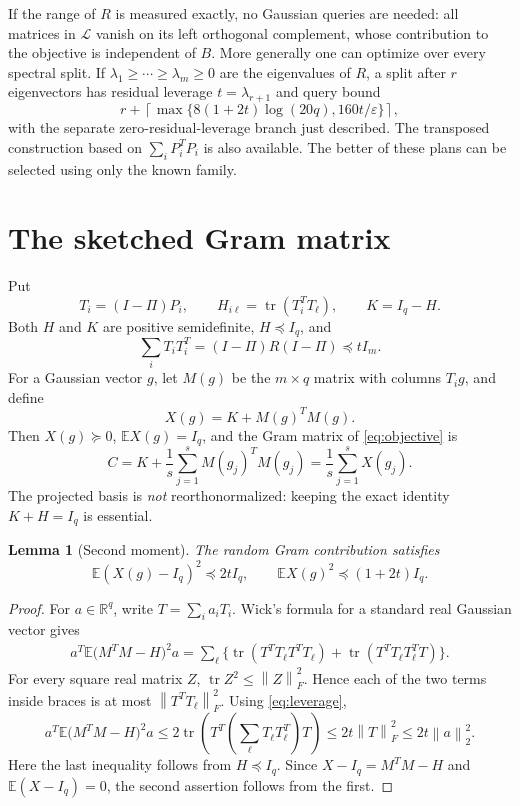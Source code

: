 \documentclass[11pt]{article}
\newtheorem{lemma}[theorem]{Lemma}
\theoremstyle{definition}
\newcommand{\R}{\mathbb R}
\newcommand{\E}{\mathbb E}
\newcommand{\tr}{\operatorname{tr}}
\newcommand{\norm}[1]{\left\lVert#1\right\rVert}
\newcommand{\eps}{\varepsilon}
\begin{document}
If the range of $R$ is measured exactly, no Gaussian queries are needed: all matrices in $\mathcal L$ vanish on its left orthogonal complement, whose contribution to the objective is independent of $B$. More generally one can optimize over every spectral split. If $\lambda_1\ge\cdots\ge\lambda_m\ge0$ are the eigenvalues of $R$, a split after $r$ eigenvectors has residual leverage $t=\lambda_{r+1}$ and query bound
\[
 r+\left\lceil\max\{8(1+2t)\log(20q),160t/\eps\}\right\rceil,
\]
with the separate zero-residual-leverage branch just described. The transposed construction based on $\sum_iP_i^TP_i$ is also available. The better of these plans can be selected using only the known family.

\section{The sketched Gram matrix}
Put
\[
 T_i=(I-\Pi)P_i,\qquad
 H_{i\ell}=\tr(T_i^TT_\ell),\qquad K=I_q-H.
\]
Both $H$ and $K$ are positive semidefinite, $H\preceq I_q$, and
\begin{equation}\label{eq:leverage}
 \sum_iT_iT_i^T=(I-\Pi)R(I-\Pi)\preceq tI_m.
\end{equation}
For a Gaussian vector $g$, let $M(g)$ be the $m\times q$ matrix with columns $T_i g$, and define
\[
 X(g)=K+M(g)^TM(g).
\]
Then $X(g)\succeq0$, $\E X(g)=I_q$, and the Gram matrix of \eqref{eq:objective} is
\[
 C=K+\frac1s\sum_{j=1}^sM(g_j)^TM(g_j)
   =\frac1s\sum_{j=1}^sX(g_j).
\]
The projected basis is \emph{not} reorthonormalized: keeping the exact identity $K+H=I_q$ is essential.

\begin{lemma}[Second moment]\label{lem:moment}
The random Gram contribution satisfies
\[
 \E(X(g)-I_q)^2\preceq2tI_q,
 \qquad \E X(g)^2\preceq(1+2t)I_q.
\]
\end{lemma}
\begin{proof}
For $a\in\R^q$, write $T=\sum_i a_iT_i$. Wick's formula for a standard real Gaussian vector gives
\begin{align*}
 a^T\E\bigl(M^TM-H\bigr)^2a
 =\sum_\ell\bigl\{
   \tr(T^TT_\ell T^TT_\ell)
   +\tr(T^TT_\ell T_\ell^TT)\bigr\}.
\end{align*}
For every square real matrix $Z$, $\tr Z^2\le\norm Z_F^2$. Hence each of the two terms inside braces is at most $\norm{T^TT_\ell}_F^2$. Using \eqref{eq:leverage},
\[
 a^T\E\bigl(M^TM-H\bigr)^2a
 \le2\tr\left(T^T\left(\sum_\ell T_\ell T_\ell^T\right)T\right)
 \le2t\norm T_F^2\le2t\norm a_2^2.
\]
Here the last inequality follows from $H\preceq I_q$. Since $X-I_q=M^TM-H$ and $\E(X-I_q)=0$, the second assertion follows from the first.
\end{proof}
\end{document}

